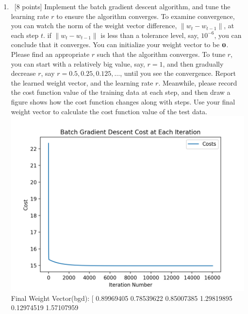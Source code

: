 \documentclass[12pt, fullpage,letterpaper]{article}
\begin{document}
\begin{enumerate}
	\begin{enumerate}
		\item~[8 points] Implement the batch gradient descent algorithm, and tune the learning rate $r$ to ensure the algorithm converges.  To examine convergence, you can watch the norm of the weight vector difference,  $\|w_{t} - w_{t-1}\|$,  at each step $t$.  if $\|w_{t} - w_{t-1}\|$ is  less than a tolerance level, say, $10^{-6}$, you can conclude that it converges. You can initialize your weight vector to be ${\bf 0}$.  Please find an appropriate $r$ such that the algorithm converges. To tune $r$, you can start with a relatively big value, say, $r=1$, and then gradually decrease $r$, say $r=0.5, 0.25, 0.125, \ldots$, until you see the convergence. 
		Report the learned weight vector, and the learning rate $r$. Meanwhile, please record the cost function  value of the training data at each step, and then draw a figure shows how the cost function changes along with steps. Use your final weight vector to calculate  the cost function value of the test data. 
		\newline
		\includegraphics[scale=.8]{BGDCost.png}\newline
		Final Weight Vector(bgd):\newline
		[ 0.89969405  0.78539622  0.85007385  1.29819895  0.12974519  1.57107959

\end{enumerate}
\end{enumerate}
\end{document}
